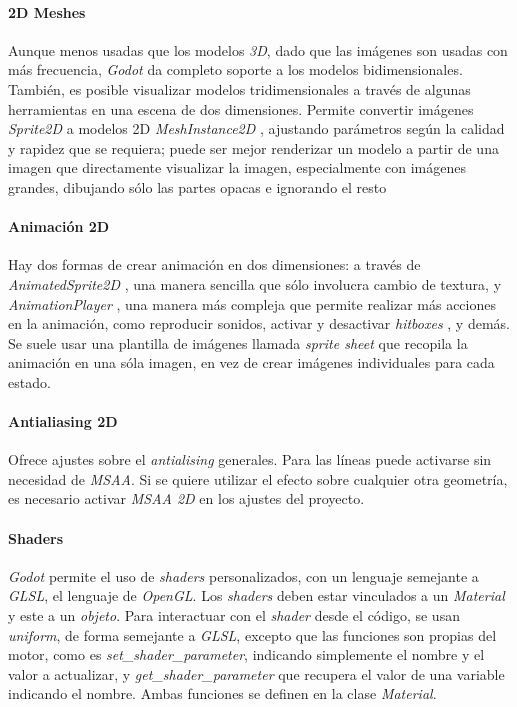 \paragraph{2D Meshes}
Aunque menos usadas que los modelos \textit{3D}, dado que las imágenes son usadas con más frecuencia, \textit{Godot} da completo soporte a los modelos bidimensionales. También, es posible visualizar modelos tridimensionales a través de algunas herramientas en una escena de dos dimensiones. Permite convertir imágenes \textit{Sprite2D} \cite{webGodotSprite2D} a modelos 2D \textit{MeshInstance2D} \cite{webGodotMI2D}, ajustando parámetros según la calidad y rapidez que se requiera; puede ser mejor renderizar un modelo a partir de una imagen que directamente visualizar la imagen, especialmente con imágenes grandes, dibujando sólo las partes opacas e ignorando el resto

\paragraph{Animación 2D}
Hay dos formas de crear animación en dos dimensiones: a través de \textit{AnimatedSprite2D} \cite{webGodotAS2D}, una manera sencilla que sólo involucra cambio de textura, y \textit{AnimationPlayer} \cite{webGodotAP}, una manera más compleja que permite realizar más acciones en la animación, como reproducir sonidos, activar y desactivar \textit{hitboxes} \cite{webValveHitbox}, y demás. Se suele usar una plantilla de imágenes llamada \textit{sprite sheet} que recopila la animación en una sóla imagen, en vez de crear imágenes individuales para cada estado.

\paragraph{Antialiasing 2D}
Ofrece ajustes sobre el \textit{antialising} generales. Para las líneas puede activarse sin necesidad de \textit{MSAA}. Si se quiere utilizar el efecto sobre cualquier otra geometría, es necesario activar \textit{MSAA 2D} \cite{webGodotMSAA2D} en los ajustes del proyecto.

\paragraph{Shaders} \label{par:shaders-godot}
\textit{Godot} permite el uso de \textit{shaders} personalizados, con un lenguaje semejante \cite{webGodotShadingLanguage} a \textit{GLSL}, el lenguaje de \textit{OpenGL}. Los \textit{shaders} deben estar vinculados a un \textit{Material} \cite{webGodotMaterial} y este a un \textit{objeto}. Para interactuar con el \textit{shader} desde el código, se usan \textit{uniform}, de forma semejante a \textit{GLSL}, excepto que las funciones son propias del motor, como es \textit{set\_shader\_parameter}, indicando simplemente el nombre y el valor a actualizar, y \textit{get\_shader\_parameter} que recupera el valor de una variable indicando el nombre. Ambas funciones se definen en la clase \textit{Material}.
    
